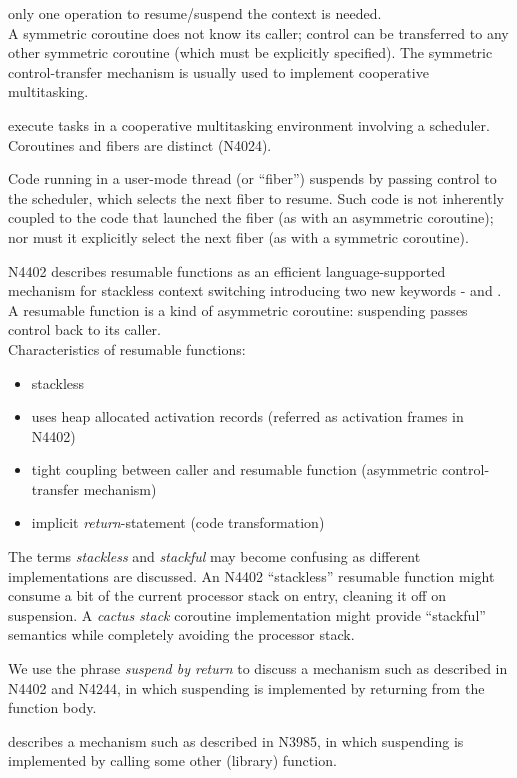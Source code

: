 only one operation to resume/suspend the context is needed.\\
A symmetric coroutine does not know its caller; control can
be transferred to any other symmetric coroutine (which must be explicitly specified).
The symmetric control-transfer mechanism is usually used to implement
cooperative multitasking.

execute tasks in a cooperative multitasking environment involving a scheduler.
Coroutines and fibers are distinct (N4024\cite{N4024}).

Code running in a user-mode thread (or ``fiber'') suspends by passing control
to the scheduler, which selects the next fiber to resume. Such code is not
inherently coupled to the code that launched the fiber (as with an asymmetric
coroutine); nor must it explicitly select the next fiber (as with a symmetric
coroutine).

N4402\cite{N4402} describes resumable functions as an efficient
language-supported mechanism for stackless context switching introducing two
new keywords - \await and \yield. A resumable function is a kind of asymmetric
coroutine: suspending passes control back to its caller.\\
Characteristics of resumable functions:
\begin{itemize}
    \item stackless
    \item uses heap allocated activation records (referred as activation frames
          in N4402)
    \item tight coupling between caller and resumable function (asymmetric
          control-transfer mechanism)
    \item implicit \emph{return}-statement\cite{N4402} (code transformation)
\end{itemize}

The terms \emph{stackless} and \emph{stackful} may become confusing as
different implementations are discussed. An N4402\cite{N4402} ``stackless''
resumable function might consume a bit of the current processor stack on
entry, cleaning it off on suspension. A \emph{cactus stack} coroutine
implementation might provide ``stackful'' semantics while completely avoiding
the processor stack.

We use the phrase \emph{suspend by return} to discuss a mechanism such as
described in N4402\cite{N4402} and N4244\cite{N4244}, in which suspending is
implemented by returning from the function body.

describes a mechanism such as described in N3985\cite{N3985}, in which
suspending is implemented by calling some other (library) function.
